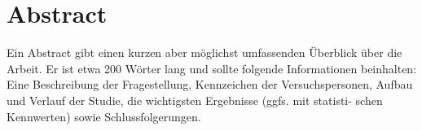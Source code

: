 
\section*{Abstract}

\noindent 
Ein Abstract gibt einen kurzen aber möglichst umfassenden Überblick über die Arbeit. Er ist etwa 200 Wörter lang und sollte folgende Informationen beinhalten: Eine Beschreibung der Fragestellung, Kennzeichen der Versuchspersonen, Aufbau und Verlauf der Studie, die wichtigsten Ergebnisse (ggfs. mit statisti- schen Kennwerten) sowie Schlussfolgerungen.

\newpage
